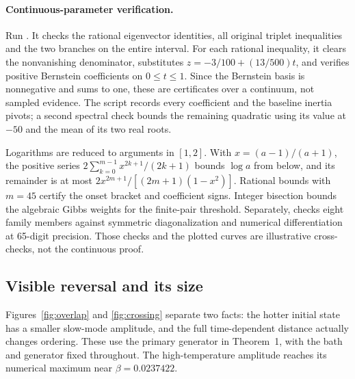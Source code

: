 \documentclass[11pt]{article}
\begin{document}
\paragraph{Continuous-parameter verification.}
Run . It checks the rational eigenvector identities, all original triplet inequalities and the two branches on the entire interval. For each rational inequality, it clears the nonvanishing denominator, substitutes $z=-3/100+(13/500)t$, and verifies positive Bernstein coefficients on $0\leq t\leq1$. Since the Bernstein basis is nonnegative and sums to one, these are certificates over a continuum, not sampled evidence. The script records every coefficient and the baseline inertia pivots; a second spectral check bounds the remaining quadratic using its value at $-50$ and the mean of its two real roots.

Logarithms are reduced to arguments in $[1,2]$. With $x=(a-1)/(a+1)$, the positive series $2\sum_{k=0}^{m-1}x^{2k+1}/(2k+1)$ bounds $\log a$ from below, and its remainder is at most $2x^{2m+1}/[(2m+1)(1-x^2)]$. Rational bounds with $m=45$ certify the onset bracket and coefficient signs. Integer bisection bounds the algebraic Gibbs weights for the finite-pair threshold. Separately,  checks eight family members against symmetric diagonalization and numerical differentiation at 65-digit precision. Those checks and the plotted curves are illustrative cross-checks, not the continuous proof.


\subsection{Visible reversal and its size}
Figures~\ref{fig:overlap} and \ref{fig:crossing} separate two facts: the hotter initial state has a smaller slow-mode amplitude, and the full time-dependent distance actually changes ordering. These use the primary generator in Theorem~1, with the bath and generator fixed throughout. The high-temperature amplitude reaches its numerical maximum near $\beta=0.0237422$.
\end{document}
